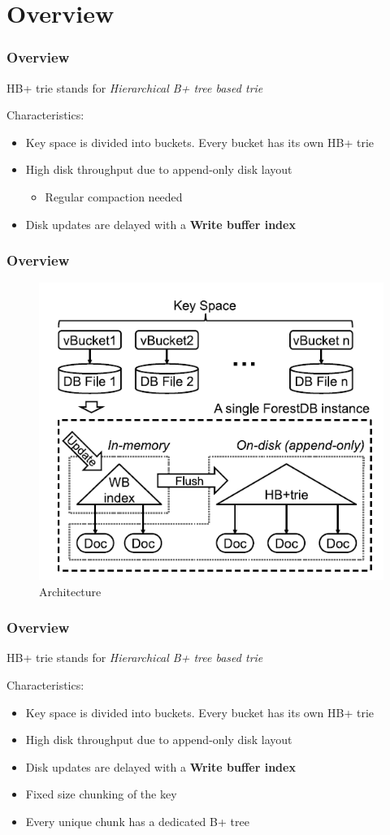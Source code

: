 \documentclass[aspectratio=169]{beamer}
\begin{document}
\section{Overview}
\begin{frame}[t]
    \frametitle{Overview}
    HB+ trie stands for \textit{Hierarchical B+ tree based trie}
    
    Characteristics:
    \begin{itemize}
    	\item Key space is divided into buckets. Every bucket has its own HB+ trie
    	\item High disk throughput due to append-only disk layout
    	 \begin{itemize}
    		\item Regular compaction needed
    	\end{itemize}
    	\item Disk updates are delayed with a \textbf{Write buffer index}
    \end{itemize}
\end{frame}
\begin{frame}[t]
	\frametitle{Overview}
	\begin{figure}[h!]
		\includegraphics[scale=0.5]{architecture}
		\caption{Architecture}
	\end{figure}
	\centering
\end{frame}
\begin{frame}[t]
	\frametitle{Overview}
	HB+ trie stands for \textit{Hierarchical B+ tree based trie}
	
	Characteristics:
	\begin{itemize}
		\item Key space is divided into buckets. Every bucket has its own HB+ trie
		\item High disk throughput due to append-only disk layout
		\item Disk updates are delayed with a \textbf{Write buffer index}
		\item Fixed size chunking of the key
		\item Every unique chunk has a dedicated B+ tree
	\end{itemize}	
\end{frame}
\end{document}

